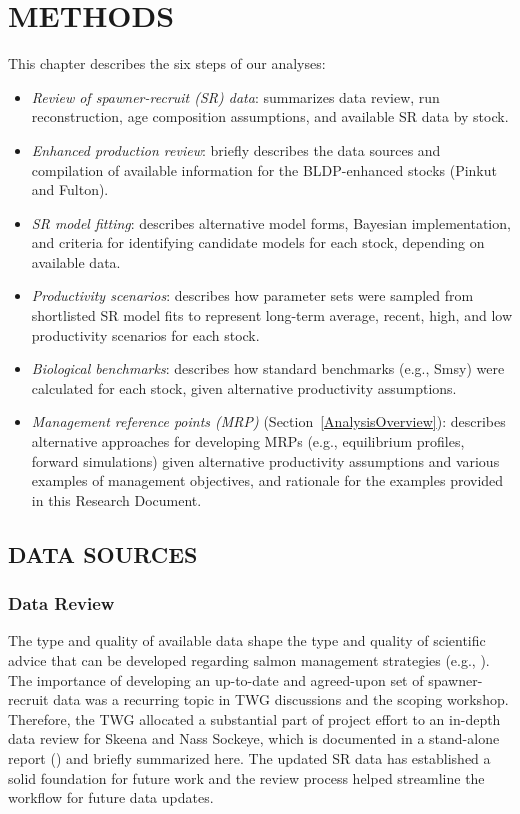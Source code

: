 \documentclass[french,11pt]{book}
\begin{document}
\section{METHODS}\label{methods}

This chapter describes the six steps of our analyses:
\begin{itemize}

\item
  \emph{Review of spawner-recruit (SR) data}: summarizes data review, run reconstruction, age composition assumptions, and available SR data by stock.
\item
  \emph{Enhanced production review}: briefly describes the data sources and compilation of available information for the BLDP-enhanced stocks (Pinkut and Fulton).
\item
  \emph{SR model fitting}: describes alternative model forms, Bayesian implementation, and criteria for identifying candidate models for each stock, depending on available data.
\item
  \emph{Productivity scenarios}: describes how parameter sets were sampled from shortlisted SR model fits to represent long-term average, recent, high, and low productivity scenarios for each stock.
\item
  \emph{Biological benchmarks}: describes how standard benchmarks (e.g., Smsy) were calculated for each stock, given alternative productivity assumptions.
\item
  \emph{Management reference points (MRP)} (Section~\ref{AnalysisOverview}): describes alternative approaches for developing MRPs (e.g., equilibrium profiles, forward simulations) given alternative productivity assumptions and various examples of management objectives, and rationale for the examples provided in this Research Document.
\end{itemize}
\subsection{DATA SOURCES}\label{DataSources}

\subsubsection{Data Review}\label{DataReview}

The type and quality of available data shape the type and quality of scientific advice that can be developed regarding salmon management strategies (e.g., ). The importance of developing an up-to-date and agreed-upon set of spawner-recruit data was a recurring topic in TWG discussions and the scoping workshop. Therefore, the TWG allocated a substantial part of project effort to an in-depth data review for Skeena and Nass Sockeye, which is documented in a stand-alone report () and briefly summarized here. The updated SR data has established a solid foundation for future work and the review process helped streamline the workflow for future data updates.
\end{document}
